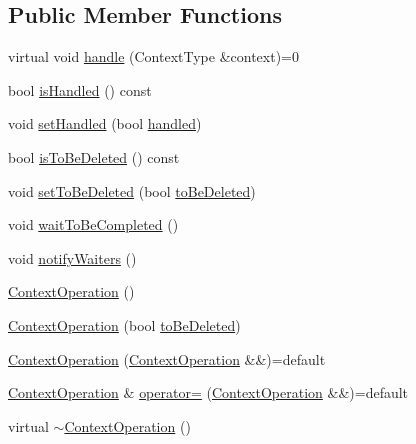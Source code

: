 \subsection*{Public Member Functions}
\begin{DoxyCompactItemize}
\item 
virtual void \hyperlink{classZeta_1_1ContextOperation_a3e7286287026324335d352933fb62a78}{handle} (Context\+Type \&context)=0
\item 
bool \hyperlink{classZeta_1_1ContextOperation_a309a672c56b746f00896e5980579593f}{is\+Handled} () const 
\item 
void \hyperlink{classZeta_1_1ContextOperation_a5b9c9a0244dfd3ea5583a8b1e29b66a0}{set\+Handled} (bool \hyperlink{classZeta_1_1ContextOperation_a015a74ff36e2bc7d9b949ad8d12d7ca1}{handled})
\item 
bool \hyperlink{classZeta_1_1ContextOperation_a016f4784e825b6f33d6a49a51f6c0232}{is\+To\+Be\+Deleted} () const 
\item 
void \hyperlink{classZeta_1_1ContextOperation_a5fbd2d0daba4c6c475faedcb8a4b6bec}{set\+To\+Be\+Deleted} (bool \hyperlink{classZeta_1_1ContextOperation_a74d249e9f1614a29999b811772a41c1b}{to\+Be\+Deleted})
\item 
void \hyperlink{classZeta_1_1ContextOperation_ac552818f408c4d7c75a954f4b92348bd}{wait\+To\+Be\+Completed} ()
\item 
void \hyperlink{classZeta_1_1ContextOperation_ad67e1e1af4b3ef3017df33f9a8dcc3c0}{notify\+Waiters} ()
\item 
\hyperlink{classZeta_1_1ContextOperation_acce7568104c7be4ba10442d91d215556}{Context\+Operation} ()
\item 
\hyperlink{classZeta_1_1ContextOperation_a241337497a8f43e1e4bff37b72a7daf5}{Context\+Operation} (bool \hyperlink{classZeta_1_1ContextOperation_a74d249e9f1614a29999b811772a41c1b}{to\+Be\+Deleted})
\item 
\hyperlink{classZeta_1_1ContextOperation_af5e7953f74575c780d9e731c557f57e1}{Context\+Operation} (\hyperlink{classZeta_1_1ContextOperation}{Context\+Operation} \&\&)=default
\item 
\hyperlink{classZeta_1_1ContextOperation}{Context\+Operation} \& \hyperlink{classZeta_1_1ContextOperation_a0d8e7b29d53c91c5bdc4a946f92e884e}{operator=} (\hyperlink{classZeta_1_1ContextOperation}{Context\+Operation} \&\&)=default
\item 
virtual \hyperlink{classZeta_1_1ContextOperation_a11dbe052f6287ac9bea5cf2e813d6616}{$\sim$\+Context\+Operation} ()
\end{DoxyCompactItemize}
